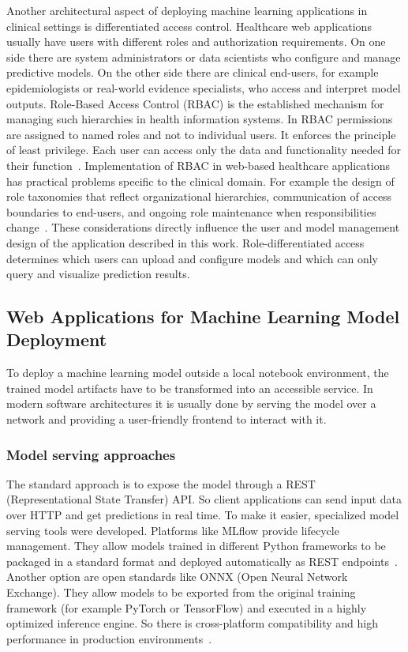 Another architectural aspect of deploying machine learning applications in clinical settings is differentiated access control. Healthcare web applications usually have users with different roles and authorization requirements. On one side there are system administrators or data scientists who configure and manage predictive models. On the other side there are clinical end-users, for example epidemiologists or real-world evidence specialists, who access and interpret model outputs. Role-Based Access Control (RBAC) is the established mechanism for managing such hierarchies in health information systems. In RBAC permissions are assigned to named roles and not to individual users. It enforces the principle of least privilege. Each user can access only the data and functionality needed for their function~\cite{kim2015rbac}. Implementation of RBAC in web-based healthcare applications has practical problems specific to the clinical domain. For example the design of role taxonomies that reflect organizational hierarchies, communication of access boundaries to end-users, and ongoing role maintenance when responsibilities change~\cite{samonte2024rbac}. These considerations directly influence the user and model management design of the application described in this work. Role-differentiated access determines which users can upload and configure models and which can only query and visualize prediction results.

\subsection{Web Applications for Machine Learning Model Deployment}
\label{sec:web_apps_ml}

To deploy a machine learning model outside a local notebook environment, the trained model artifacts have to be transformed into an accessible service. In modern software architectures it is usually done by serving the model over a network and providing a user-friendly frontend to interact with it.

\subsubsection{Model serving approaches}
The standard approach is to expose the model through a REST (Representational State Transfer) API. So client applications can send input data over HTTP and get predictions in real time. To make it easier, specialized model serving tools were developed. Platforms like MLflow provide lifecycle management. They allow models trained in different Python frameworks to be packaged in a standard format and deployed automatically as REST endpoints~\cite{mlflow_serving_2026}. Another option are open standards like ONNX (Open Neural Network Exchange). They allow models to be exported from the original training framework (for example PyTorch or TensorFlow) and executed in a highly optimized inference engine. So there is cross-platform compatibility and high performance in production environments~\cite{onnx_serving_2020}.

